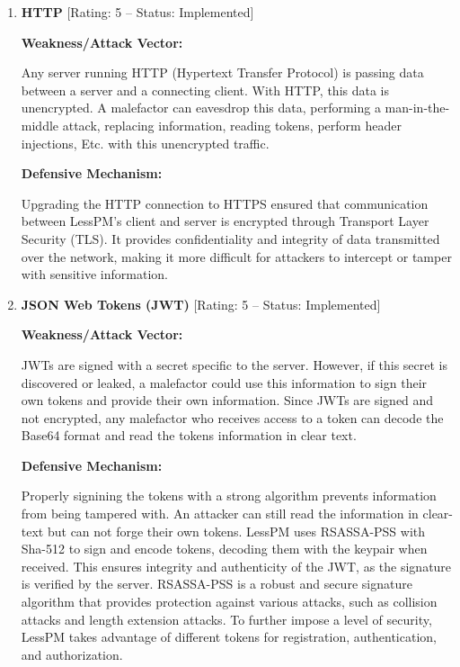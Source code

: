 \begin{enumerate}[label=$\blacktriangleright$]
  \item \textbf{HTTP} [Rating: 5 -- Status: Implemented]

  \textbf{Weakness/Attack Vector:}

  Any server running HTTP (Hypertext Transfer Protocol) is passing data
  between a server and a connecting client.
  With HTTP, this data is unencrypted.
  A malefactor can eavesdrop this data, performing a man-in-the-middle attack,
  replacing information, reading tokens, perform header injections, Etc.
  with this unencrypted traffic.

  \textbf{Defensive Mechanism:}

  Upgrading the HTTP connection to HTTPS ensured that communication between
  LessPM's client and server is encrypted through Transport Layer
  Security (TLS).
  It provides confidentiality and integrity of data transmitted over the
  network, making it more difficult for attackers to intercept or tamper with
  sensitive information.

  \item \textbf{JSON Web Tokens (JWT)} [Rating: 5 -- Status: Implemented]

  \textbf{Weakness/Attack Vector:}

  JWTs are signed with a secret specific to the server.
  However, if this secret is discovered or leaked, a malefactor could use this
  information to sign their own tokens and provide their own information.
  Since JWTs are signed and not encrypted, any malefactor who receives access
  to a token can decode the Base64 format and read the tokens information in
  clear text.

  \textbf{Defensive Mechanism:}

  Properly signining the tokens with a strong algorithm prevents information
  from being tampered with.
  An attacker can still read the information in clear-text but can not forge
  their own tokens.
  LessPM uses RSASSA-PSS with Sha-512 to sign and encode tokens, decoding
  them with the keypair when received.
  This ensures integrity and authenticity of the JWT, as the signature is
  verified by the server.
  RSASSA-PSS is a robust and secure signature algorithm that provides protection
  against various attacks, such as collision attacks and length extension
  attacks.
  To further impose a level of security, LessPM takes advantage of different
  tokens for registration, authentication, and authorization.


\end{enumerate}
